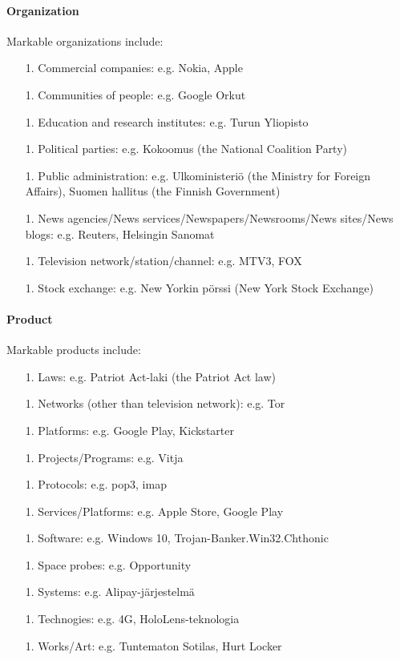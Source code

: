 \documentclass[11pt]{article}
\begin{document}
\paragraph{Organization}

Markable organizations include:

\begin{itemize}

\item[1.] Commercial companies: e.g. Nokia, Apple
\item[1.] Communities of people: e.g. Google Orkut
\item[1.] Education and research institutes: e.g. Turun Yliopisto
\item[1.] Political parties: e.g. Kokoomus (the National Coalition Party)
\item[1.] Public administration: e.g. Ulkoministeri\"o (the Ministry for Foreign Affairs), Suomen hallitus (the Finnish Government)
\item[1.] News agencies/News services/Newspapers/Newsrooms/News sites/News blogs: e.g. Reuters, Helsingin Sanomat
\item[1.] Television network/station/channel: e.g. MTV3, FOX
\item[1.] Stock exchange: e.g. New Yorkin p\"orssi (New York Stock Exchange)

\end{itemize}


\paragraph{Product}

Markable products include:

\begin{itemize}

\item[1.] Laws: e.g. Patriot Act-laki (the Patriot Act law)
\item[1.] Networks (other than television network): e.g. Tor
\item[1.] Platforms: e.g. Google Play, Kickstarter
\item[1.] Projects/Programs: e.g. Vitja
\item[1.] Protocols: e.g. pop3, imap
\item[1.] Services/Platforms: e.g. Apple Store, Google Play
\item[1.] Software: e.g. Windows 10, Trojan-Banker.Win32.Chthonic
\item[1.] Space probes: e.g. Opportunity
\item[1.] Systems: e.g. Alipay-j\"arjestelm\"a
\item[1.] Technogies: e.g. 4G, HoloLens-teknologia
\item[1.] Works/Art: e.g. Tuntematon Sotilas, Hurt Locker
 
\end{itemize}
\end{document}
